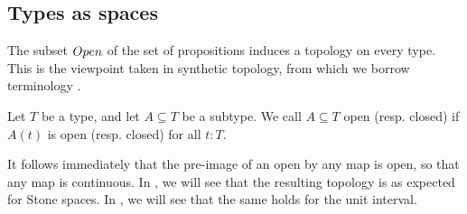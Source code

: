 \subsection{Types as spaces}
The subset $\Open$ of the set of propositions induces a topology on every type. 
This is the viewpoint taken in synthetic topology, from which we borrow terminology \cite{SyntheticTopologyEscardo, SyntheticTopologyLesnik}. 

\begin{definition}
  Let $T$ be a type, and let $A\subseteq T$ be a subtype. 
  We call $A\subseteq T$ open (resp. closed) if $A(t)$ is open (resp. closed) for all $t:T$.
\end{definition}

\begin{remark}
  It follows immediately that the pre-image of an open by any map is open, so that any map is continuous. 
  In , we will see that the resulting topology is as expected for Stone spaces.
  In , we will see that the same holds for the unit interval. 
\end{remark}



